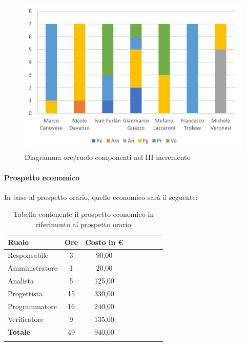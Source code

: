 \begin{figure}[H]
	\centering
	\includegraphics[width=0.8\linewidth]{res/images/preventivo/dettaglio_poc/3-1.png}
	\caption{Diagramma ore/ruolo componenti nel III incremento}
	\label{fig:diagramma suddivisione ruoli III incremento}
\end{figure}

\paragraph{Prospetto economico}
In base al prospetto orario, quello economico sarà il seguente:

\begin{longtable}{|l|c|c|c|c|c|c|c|}
	\hline
	\rowcolor{lighter-grayer}
	\textbf{Ruolo}  & \textbf{Ore} & \textbf{Costo in €} \\
	\hline
	\endfirsthead

	\hline
	Responsabile    & 3            & 90,00              \\
	\hline
	\hline
	Amministratore  & 1            & 20,00               \\
	\hline
	\hline
	Analista        & 5           & 125,00              \\
	\hline
	\hline
	Progettista     & 15            & 330,00                   \\
	\hline
	\hline
	Programmatore   & 16            & 240,00                   \\
	\hline
	\hline
	Verificatore    & 9           & 135,00              \\
	\hline
	\textbf{Totale} & 49           & 940,00            \\
	\hline
	\rowcolor{white}
	\caption{Tabella contenente il prospetto economico in riferimento al prospetto orario}
\end{longtable}
\pagebreak

